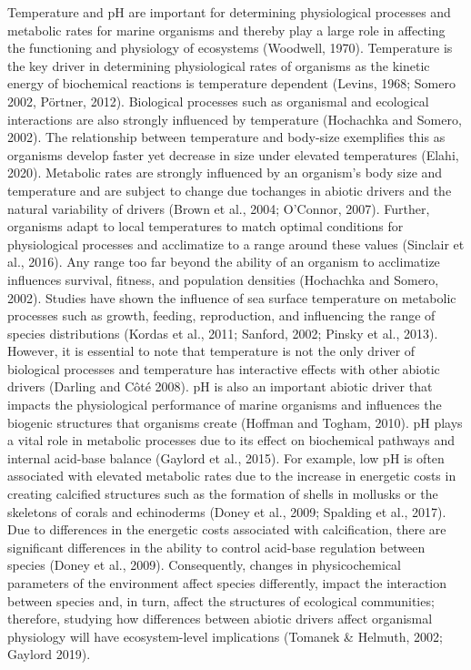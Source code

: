 \documentclass[
  11pt,
]{article}
\begin{document}
\begin{centering}
Temperature and pH are important for determining physiological processes
and metabolic rates for marine organisms and thereby play a large role
in affecting the functioning and physiology of ecosystems (Woodwell,
1970). Temperature is the key driver in determining physiological rates
of organisms as the kinetic energy of biochemical reactions is
temperature dependent (Levins, 1968; Somero 2002, Pörtner, 2012).
Biological processes such as organismal and ecological interactions are
also strongly influenced by temperature (Hochachka and Somero, 2002).
The relationship between temperature and body-size exemplifies this as
organisms develop faster yet decrease in size under elevated
temperatures (Elahi, 2020). Metabolic rates are strongly influenced by
an organism's body size and temperature and are subject to change due
tochanges in abiotic drivers and the natural variability of drivers
(Brown et al., 2004; O'Connor, 2007). Further, organisms adapt to local
temperatures to match optimal conditions for physiological processes and
acclimatize to a range around these values (Sinclair et al., 2016). Any
range too far beyond the ability of an organism to acclimatize
influences survival, fitness, and population densities (Hochachka and
Somero, 2002). Studies have shown the influence of sea surface
temperature on metabolic processes such as growth, feeding,
reproduction, and influencing the range of species distributions (Kordas
et al., 2011; Sanford, 2002; Pinsky et al., 2013). However, it is
essential to note that temperature is not the only driver of biological
processes and temperature has interactive effects with other abiotic
drivers (Darling and Côté 2008). pH is also an important abiotic driver
that impacts the physiological performance of marine organisms and
influences the biogenic structures that organisms create (Hoffman and
Togham, 2010). pH plays a vital role in metabolic processes due to its
effect on biochemical pathways and internal acid-base balance (Gaylord
et al., 2015). For example, low pH is often associated with elevated
metabolic rates due to the increase in energetic costs in creating
calcified structures such as the formation of shells in mollusks or the
skeletons of corals and echinoderms (Doney et al., 2009; Spalding et
al., 2017). Due to differences in the energetic costs associated with
calcification, there are significant differences in the ability to
control acid-base regulation between species (Doney et al., 2009).
Consequently, changes in physicochemical parameters of the environment
affect species differently, impact the interaction between species and,
in turn, affect the structures of ecological communities; therefore,
studying how differences between abiotic drivers affect organismal
physiology will have ecosystem-level implications (Tomanek \& Helmuth,
2002; Gaylord 2019).


\end{centering}
\end{document}

